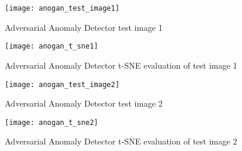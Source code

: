 \begin{figure}[htb]
  \centering
  \texttt{[image: anogan\_test\_image1]}
  \caption[Adversarial Anomaly Detector test image 1]{Adversarial Anomaly Detector test image 1}
  \label{fig:anogan_test_image_1}
\end{figure}

\begin{figure}[htb]
  \centering
  \texttt{[image: anogan\_t\_sne1]}
  \caption[Adversarial Anomaly Detector t-SNE evaluation of test image 1]{Adversarial Anomaly Detector t-SNE evaluation of test image 1}
  \label{fig:anogan_eval_test_image_1}
\end{figure}

\begin{figure}[htb]
  \centering
  \texttt{[image: anogan\_test\_image2]}
  \caption[Adversarial Anomaly Detector test image 2]{Adversarial Anomaly Detector test image 2}
  \label{fig:anogan_test_image_1}
\end{figure}

\begin{figure}[htb]
  \centering
  \texttt{[image: anogan\_t\_sne2]}
  \caption[Adversarial Anomaly Detector t-SNE evaluation of test image 2]{Adversarial Anomaly Detector t-SNE evaluation of test image 2}
  \label{fig:anogan_eval_test_image_2}
\end{figure}
